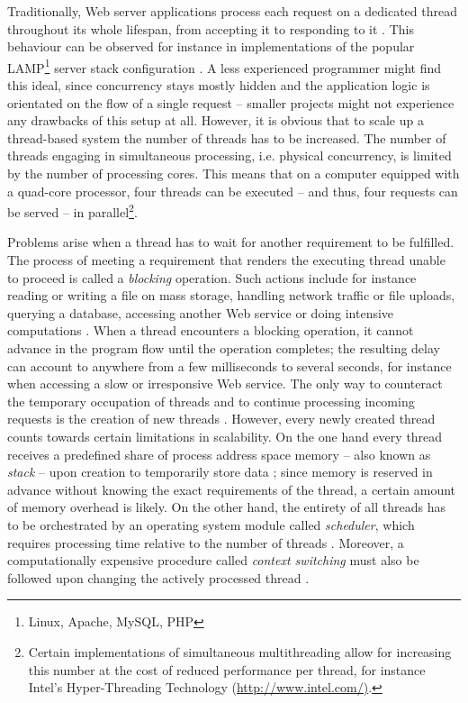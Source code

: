 Traditionally, Web server applications process each request on a dedicated thread throughout its whole lifespan, from accepting it to responding to it \cite[p. 162]{Henderson2006}. This behaviour can be observed for instance in implementations of the popular LAMP\footnote{Linux, Apache, MySQL, PHP} server stack configuration \cite[p. 48]{Henderson2006}. A less experienced programmer might find this ideal, since concurrency stays mostly hidden and the application logic is orientated on the flow of a single request -- smaller projects might not experience any drawbacks of this setup at all. However, it is obvious that to scale up a thread-based system the number of threads has to be increased. The number of threads engaging in simultaneous processing, i.e. physical concurrency, is limited by the number of processing cores. This means that on a computer equipped with a quad-core processor, four threads can be executed -- and thus, four requests can be served -- in parallel\footnote{Certain implementations of simultaneous multithreading allow for increasing this number at the cost of reduced performance per thread, for instance Intel's Hyper-Threading Technology (\url{http://www.intel.com/)}.}.

Problems arise when a thread has to wait for another requirement to be fulfilled. The process of meeting a requirement that renders the executing thread unable to proceed is called a \textit{blocking} operation. Such actions include for instance reading or writing a file on mass storage, handling network traffic or file uploads, querying a database, accessing another Web service or doing intensive computations \cite[p. 196]{Henderson2006}. When a thread encounters a blocking operation, it cannot advance in the program flow until the operation completes; the resulting delay can account to anywhere from a few milliseconds to several seconds, for instance when accessing a slow or irresponsive Web service. The only way to counteract the temporary occupation of threads and to continue processing incoming requests is the creation of new threads \cite[p. 36]{Hughes-Croucher2012}. However, every newly created thread counts towards certain limitations in scalability. On the one hand every thread receives a predefined share of process address space memory -- also known as \textit{stack} -- upon creation to temporarily store data \cite{Russinovich}; since memory is reserved in advance without knowing the exact requirements of the thread, a certain amount of memory overhead is likely. On the other hand, the entirety of all threads has to be orchestrated by an operating system module called \textit{scheduler}, which requires processing time relative to the number of threads \cite{Russinovich}. Moreover, a computationally expensive procedure called \textit{context switching} must also be followed upon changing the actively processed thread \cite{threads_vs_events}. 

